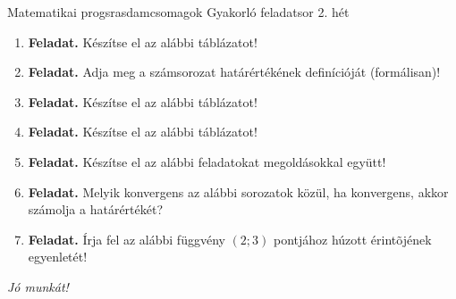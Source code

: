 \documentclass[12pt,a4paper]{article}
\begin{document}
\pagestyle{empty}
\noindent

Matematikai progsrasdamcsomagok
Gyakorló feladatsor
2. hét

\begin{enumerate}
    \item \textbf{Feladat.} Készítse el az alábbi táblázatot!

    \item \textbf{Feladat.} Adja meg a számsorozat határértékének definícióját (formálisan)!

    \item \textbf{Feladat.} Készítse el az alábbi táblázatot!

    \item \textbf{Feladat.} Készítse el az alábbi táblázatot!

    \item \textbf{Feladat.} Készítse el az alábbi feladatokat megoldásokkal együtt!

          \vfill\eject
    \item \textbf{Feladat.} Melyik konvergens az alábbi sorozatok közül, ha konvergens, akkor számolja a határértékét?

    \item \textbf{Feladat.} Írja fel az alábbi függvény $(2;3)$ pontjához húzott érintõjének egyenletét! \par
\end{enumerate}

\vspace{0.2cm}
\begin{center}
    \textit{Jó munkát!}
\end{center}
\end{document}
